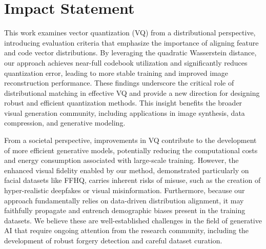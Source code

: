 \section{Impact Statement}


This work examines vector quantization (VQ) from a distributional perspective, introducing evaluation criteria that emphasize the importance of aligning feature and code vector distributions. By leveraging the quadratic Wasserstein distance, our approach achieves near-full codebook utilization and significantly reduces quantization error, leading to more stable training and improved image reconstruction performance. These findings underscore the critical role of distributional matching in effective VQ and provide a new direction for designing robust and efficient quantization methods. This insight benefits the broader visual generation community, including applications in image synthesis, data compression, and generative modeling.

From a societal perspective, improvements in VQ contribute to the development of more efficient generative models, potentially reducing the computational costs and energy consumption associated with large-scale training. However, the enhanced visual fidelity enabled by our method, demonstrated particularly on facial datasets like FFHQ, carries inherent risks of misuse, such as the creation of hyper-realistic deepfakes or visual misinformation. Furthermore, because our approach fundamentally relies on data-driven distribution alignment, it may faithfully propagate and entrench demographic biases present in the training datasets. We believe these are well-established challenges in the field of generative AI that require ongoing attention from the research community, including the development of robust forgery detection and careful dataset curation.



